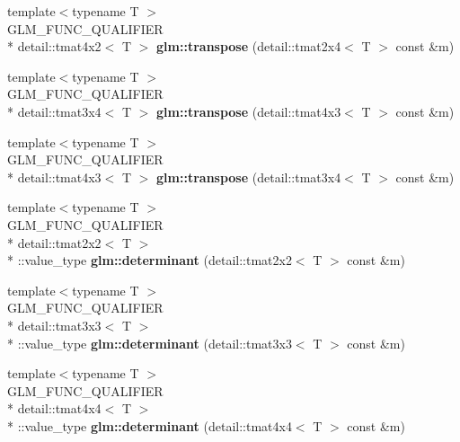 \begin{DoxyCompactItemize}
\item 
\hypertarget{namespaceglm_a002e61c20163bd62a0af2d18a9a3af7a}{{\footnotesize template$<$typename T $>$ }\\G\-L\-M\-\_\-\-F\-U\-N\-C\-\_\-\-Q\-U\-A\-L\-I\-F\-I\-E\-R \\*
detail\-::tmat4x2$<$ T $>$ {\bfseries glm\-::transpose} (detail\-::tmat2x4$<$ T $>$ const \&m)}\label{namespaceglm_a002e61c20163bd62a0af2d18a9a3af7a}

\item 
\hypertarget{namespaceglm_ab3249f9f058bed8dfae6bf98f388ba7e}{{\footnotesize template$<$typename T $>$ }\\G\-L\-M\-\_\-\-F\-U\-N\-C\-\_\-\-Q\-U\-A\-L\-I\-F\-I\-E\-R \\*
detail\-::tmat3x4$<$ T $>$ {\bfseries glm\-::transpose} (detail\-::tmat4x3$<$ T $>$ const \&m)}\label{namespaceglm_ab3249f9f058bed8dfae6bf98f388ba7e}

\item 
\hypertarget{namespaceglm_ada628757003c8d123a0c92140d7abe71}{{\footnotesize template$<$typename T $>$ }\\G\-L\-M\-\_\-\-F\-U\-N\-C\-\_\-\-Q\-U\-A\-L\-I\-F\-I\-E\-R \\*
detail\-::tmat4x3$<$ T $>$ {\bfseries glm\-::transpose} (detail\-::tmat3x4$<$ T $>$ const \&m)}\label{namespaceglm_ada628757003c8d123a0c92140d7abe71}

\item 
\hypertarget{namespaceglm_af46227c76d96e80fee1fd796c8bcd381}{{\footnotesize template$<$typename T $>$ }\\G\-L\-M\-\_\-\-F\-U\-N\-C\-\_\-\-Q\-U\-A\-L\-I\-F\-I\-E\-R \\*
detail\-::tmat2x2$<$ T $>$\\*
\-::value\-\_\-type {\bfseries glm\-::determinant} (detail\-::tmat2x2$<$ T $>$ const \&m)}\label{namespaceglm_af46227c76d96e80fee1fd796c8bcd381}

\item 
\hypertarget{namespaceglm_a82f21c90b1e7ac79de26ae25db61b841}{{\footnotesize template$<$typename T $>$ }\\G\-L\-M\-\_\-\-F\-U\-N\-C\-\_\-\-Q\-U\-A\-L\-I\-F\-I\-E\-R \\*
detail\-::tmat3x3$<$ T $>$\\*
\-::value\-\_\-type {\bfseries glm\-::determinant} (detail\-::tmat3x3$<$ T $>$ const \&m)}\label{namespaceglm_a82f21c90b1e7ac79de26ae25db61b841}

\item 
\hypertarget{namespaceglm_a8d6ce863c226bb3e6f7c607a82fcbb35}{{\footnotesize template$<$typename T $>$ }\\G\-L\-M\-\_\-\-F\-U\-N\-C\-\_\-\-Q\-U\-A\-L\-I\-F\-I\-E\-R \\*
detail\-::tmat4x4$<$ T $>$\\*
\-::value\-\_\-type {\bfseries glm\-::determinant} (detail\-::tmat4x4$<$ T $>$ const \&m)}\label{namespaceglm_a8d6ce863c226bb3e6f7c607a82fcbb35}


\end{DoxyCompactItemize}
